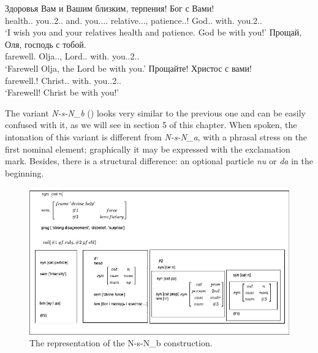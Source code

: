 \documentclass[output=paper]{langscibook}
\begin{document}
\ea
\ea
\gll Здоровья Вам и Вашим близким, терпения! Бог с Вами!\\
     health.{\NOUN}.{\GEN} you.{\PRON}.2.{\DAT}.{\PL} and.{\CONJ} you.{\PRON}.{\POSS}.{\DAT}.{\PL} relative.{\NOUN}.{\DAT}.{\PL}, patience.{\NOUN}.{\GEN}! God.{\NOUN}.{\NOM} with.{\PREP} you.2.{\INSTR}.{\PL}\\
\glt `I wish you and your relatives health and patience. God be with you!'
\ex
\gll Прощай, Оля, господь с тобой.\\
     farewell.{\ADV} Olja.{\NOUNPROPER}.{\NOM}, Lord.{\NOUN}.{\NOM} with.{\PREP} you.{\PRON}.2.{\INSTR}.{\SG}\\
\glt `Farewell Olja, the Lord be with you.'
\ex
\gll Прощайте! Христос с вами!\\
     farewell.{\ADV}! Christ.{\NOUN}.{\NOM} with.{\PREP} you.{\PRON}.2.{\INSTR}.{\PL}\\
\glt `Farewell! Christ be with you!'
\z
\z

The variant \textit{N-s-N\_b} () looks very similar to the previous one and can be easily confused with it, as we will see in section 5 of this chapter. When spoken, the intonation of this variant is different from \textit{N-s-N\_a}, with a phrasal stress on the first nominal element; graphically it may be expressed with the exclamation mark. Besides, there is a structural difference: an optional particle \textit{nu} or \textit{da} in the beginning.


\begin{figure}
\includegraphics[width=\textwidth]{figures/mikhailov-img003.jpg}
\caption{\label{fig:mikhailov:3}The representation of the N-s-N\_b construction.}

\end{figure}
\end{document}
